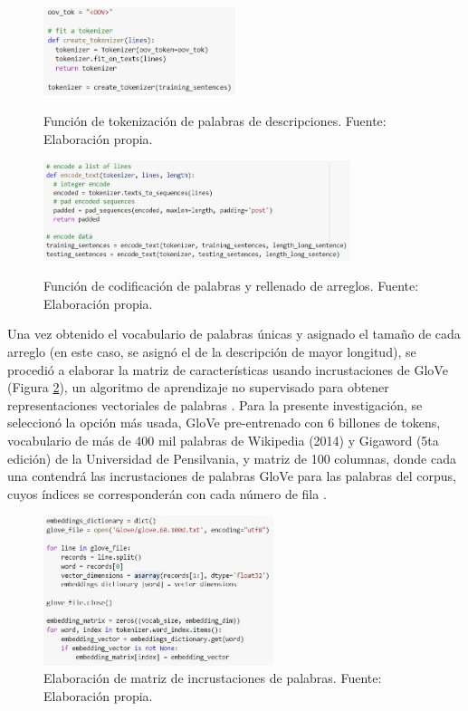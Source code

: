 \begin{figure}[htbp]
	\begin{center}
		\includegraphics[width=0.50\textwidth]{4/figures/description_tokenizer_function.jpg}
		\caption{Función de tokenización de palabras de descripciones. Fuente: Elaboración propia.}
		\label{4:fig36}
		\includegraphics[width=0.80\textwidth]{4/figures/description_encoder_function.jpg}
		\caption{Función de codificación de palabras y rellenado de arreglos. Fuente: Elaboración propia.}
		\label{4:fig37}
	\end{center}
\end{figure}

Una vez obtenido el vocabulario de palabras únicas y asignado el tamaño de cada arreglo (en este caso, se asignó el de la descripción de mayor longitud), se procedió a elaborar la matriz de características usando incrustaciones de GloVe (Figura \ref{4:fig38}), un algoritmo de aprendizaje no supervisado para obtener representaciones vectoriales de palabras \parencite{gl_pennington_glove}. Para la presente investigación, se seleccionó la opción más usada, GloVe pre-entrenado con 6 billones de tokens, vocabulario de más de 400 mil palabras de Wikipedia (2014) y Gigaword (5ta edición) de la Universidad de Pensilvania, y matriz de 100 columnas, donde cada una contendrá las incrustaciones de palabras GloVe para las palabras del corpus, cuyos índices se corresponderán con cada número de fila \parencite{tec_malik2019pythonnlp}.

\begin{figure}[!ht]
	\begin{center}
		\includegraphics[width=0.60\textwidth]{4/figures/description_glove.jpg}
		\caption{Elaboración de matriz de incrustaciones de palabras. Fuente: Elaboración propia.}
		\label{4:fig38}
	\end{center}
\end{figure}

